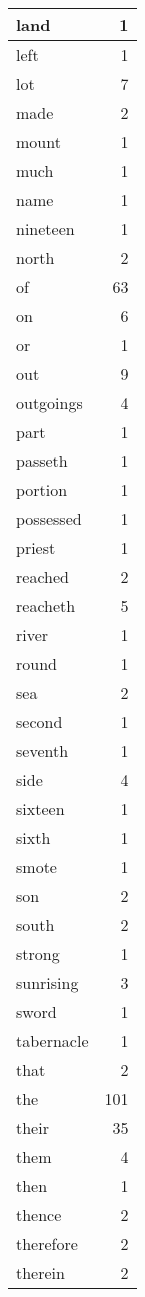 \begin{center}
\begin{longtable}{l|r}
land & 1\\ \hline 
left & 1\\ \hline 
lot & 7\\ \hline 
made & 2\\ \hline 
mount & 1\\ \hline 
much & 1\\ \hline 
name & 1\\ \hline 
nineteen & 1\\ \hline 
north & 2\\ \hline 
of & 63\\ \hline 
on & 6\\ \hline 
or & 1\\ \hline 
out & 9\\ \hline 
outgoings & 4\\ \hline 
part & 1\\ \hline 
passeth & 1\\ \hline 
portion & 1\\ \hline 
possessed & 1\\ \hline 
priest & 1\\ \hline 
reached & 2\\ \hline 
reacheth & 5\\ \hline 
river & 1\\ \hline 
round & 1\\ \hline 
sea & 2\\ \hline 
second & 1\\ \hline 
seventh & 1\\ \hline 
side & 4\\ \hline 
sixteen & 1\\ \hline 
sixth & 1\\ \hline 
smote & 1\\ \hline 
son & 2\\ \hline 
south & 2\\ \hline 
strong & 1\\ \hline 
sunrising & 3\\ \hline 
sword & 1\\ \hline 
tabernacle & 1\\ \hline 
that & 2\\ \hline 
the & 101\\ \hline 
their & 35\\ \hline 
them & 4\\ \hline 
then & 1\\ \hline 
thence & 2\\ \hline 
therefore & 2\\ \hline 
therein & 2\\ \hline 

\end{longtable}
\end{center}

